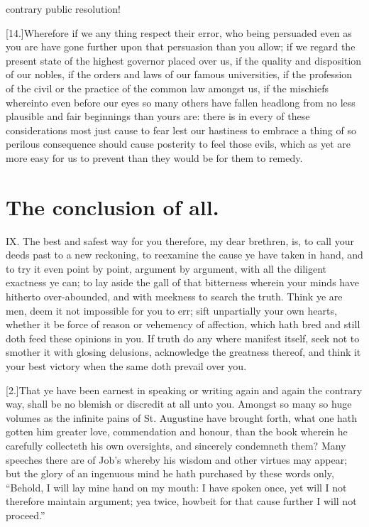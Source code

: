contrary public resolution!

[14.]Wherefore if we any thing respect their error, who being persuaded even as you are have gone further upon that persuasion than you allow; if we regard the present state of the highest governor placed over us, if the quality and disposition of our nobles, if the orders and laws of our famous universities, if the profession of the civil or the practice of the common law amongst us, if the mischiefs whereinto even before our eyes so many others have fallen headlong from no less plausible and fair beginnings than yours are: there is in every of these considerations most just cause to fear lest our hastiness to embrace a thing of so perilous consequence should cause posterity to feel those evils, which as yet are more easy for us to prevent than they would be for them to remedy.

\section*{The conclusion of all.}

IX. The best and safest way for you therefore, my dear brethren, is, to call your deeds past to a new reckoning, to reexamine the cause ye have taken in hand, and to try it even point by point, argument by argument, with all the diligent exactness ye can; to lay aside the gall of that bitterness wherein your minds have hitherto over-abounded, and with meekness to search the truth. Think ye are men, deem it not impossible for you to err; sift unpartially your own hearts, whether it be force of reason or vehemency of affection, which hath bred and still doth feed these opinions in you. If truth do any where manifest itself, seek not to smother it with glosing delusions, acknowledge the greatness thereof, and think it your best victory when the same doth prevail over you.

[2.]That ye have been earnest in speaking or writing again and again the contrary way, shall be no blemish or discredit at all unto you. Amongst so many so huge volumes as the infinite pains of St. Augustine have brought forth, what one hath gotten him greater love, commendation and honour, than the book wherein he carefully collecteth his own oversights, and sincerely condemneth them? Many speeches there are of Job’s whereby his wisdom and other virtues may appear; but the glory of an ingenuous mind he hath purchased by these words only, “Behold, I will lay mine hand on my mouth: I have spoken once, yet will I not therefore maintain argument; yea twice, howbeit for that cause further I will not proceed.”

